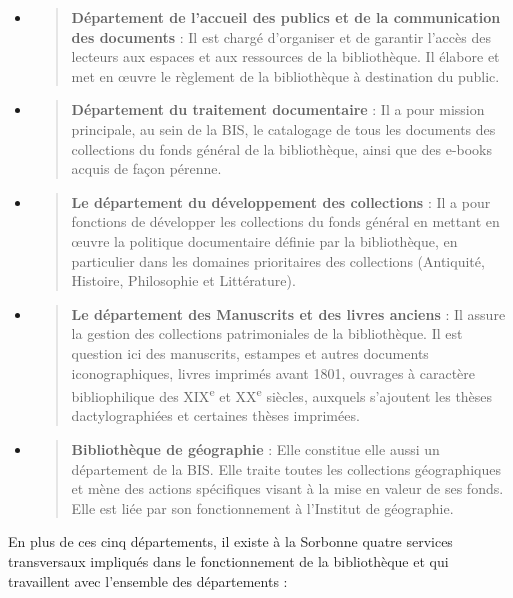 \documentclass[a4paper,12pt,twoside]{book}
\begin{document}
\begin{itemize}
	\item
	\begin{quote}
		\textbf{Département de l'accueil des publics et de la communication des documents} : Il est chargé d’organiser et de garantir l’accès des lecteurs aux espaces et aux ressources de la bibliothèque. Il élabore et met en œuvre le règlement de la bibliothèque à destination du public.
	\end{quote}
	\item
	\begin{quote}
		\textbf{Département du traitement documentaire
		} :
		Il a pour mission principale, au sein de la BIS, le catalogage de tous les documents des collections du fonds général de la bibliothèque, ainsi que des e-books acquis de façon pérenne.
	\end{quote}
	\item
	\begin{quote}
		\textbf{Le département du développement des collections
		} :
		Il a pour fonctions de développer les collections du fonds général en mettant en œuvre la politique documentaire définie par la bibliothèque, en particulier dans les domaines prioritaires des collections (Antiquité, Histoire, Philosophie et Littérature).
	\end{quote}
	\item
	\begin{quote}
		\textbf{Le département des Manuscrits et des livres anciens} : Il assure la gestion des collections patrimoniales de la bibliothèque. Il est question ici des manuscrits, estampes et autres documents iconographiques, livres imprimés avant 1801, ouvrages à caractère bibliophilique des XIX\textsuperscript{e} et XX\textsuperscript{e} siècles, auxquels s’ajoutent les thèses dactylographiées et certaines thèses imprimées.
	\end{quote}
	\item
	\begin{quote}
		\textbf{Bibliothèque de géographie
		} : Elle constitue elle aussi un département de la BIS. Elle traite toutes les collections géographiques et mène des actions spécifiques visant à la mise en valeur de ses fonds. Elle est liée par son fonctionnement à l’Institut de géographie. \\
	\end{quote}
\end{itemize} 

En plus de ces cinq départements, il existe à la Sorbonne quatre services transversaux impliqués dans le fonctionnement de la bibliothèque et qui travaillent avec l'ensemble des départements : \\
\end{document}
